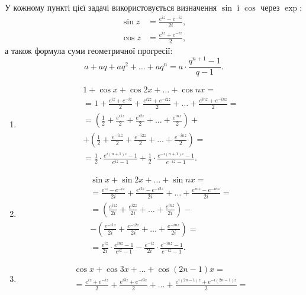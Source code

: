 \begin{solution}
	У кожному пункті цієї задачі використовується визначення $\sin$ і $\cos$ через $\exp$:
	\begin{align}
		\label{eq:1.1}
		\sin z &= \frac{e^{iz} - e^{-iz}}{2i}, \\
		\cos z &= \frac{e^{iz} + e^{-iz}}{2},
	\end{align}
	а також формула суми геометричної прогресії:
	\begin{equation}
		\label{eq:1.2}
		a + a q + a q^2 + \ldots + a q^n = a \cdot \frac{q^{n + 1} - 1}{q - 1}.
	\end{equation}

	\begin{enumerate}
		\item \begin{multline*}
			1 + \cos x + \cos 2x + \ldots + \cos nx = \\
			= 1 + \frac{e^{iz} + e^{-iz}}{2} + \frac{e^{i2z} + e^{-i2z}}{2} + \ldots + \frac{e^{inz} + e^{-inz}}{2} = \\
			= \left( \frac{1}{2} + \frac{e^{i1z}}{2} + \frac{e^{i2z}}{2} + \ldots + \frac{e^{inz}}{2} \right) + \\
			+ \left( \frac{1}{2} + \frac{e^{-i1z}}{2} + \frac{e^{-i2z}}{2} + \ldots + \frac{e^{-inz}}{2} \right) = \\
			= \frac12 \cdot \frac{e^{i(n+1)z}-1}{e^{iz}-1} + \frac12 \cdot \frac{e^{-i(n+1)z}-1}{e^{-iz}-1}.
		\end{multline*}
		\item \begin{multline*}
			\sin x + \sin 2x + \ldots + \sin nx = \\
			= \frac{e^{iz} - e^{-iz}}{2i} + \frac{e^{i2z} - e^{-i2z}}{2i} + \ldots + \frac{e^{inz} - e^{-inz}}{2i} = \\
			= \left( \frac{e^{i1z}}{2i} + \frac{e^{i2z}}{2i} + \ldots + \frac{e^{inz}}{2i} \right) - \\
			- \left( \frac{e^{-i1z}}{2i} + \frac{e^{-i2z}}{2i} + \ldots + \frac{e^{-inz}}{2i} \right) = \\
			= \frac{e^{iz}}{2i} \cdot \frac{e^{inz}-1}{e^{iz} - 1} - \frac{e^{-iz}}{2i} \cdot \frac{e^{-inz}-1}{e^{-iz}-1}.
		\end{multline*}
		\item \begin{multline*}
			\cos x + \cos 3x + \ldots + \cos (2n - 1) x = \\
			= \frac{e^{iz} + e^{-iz}}{2} + \frac{e^{i3z} + e^{-i3z}}{2} + \ldots + \frac{e^{i(2n-1)z} + e^{-i(2n-1)z}}{2} = \\

\end{multline*}
\end{enumerate}
\end{solution}

